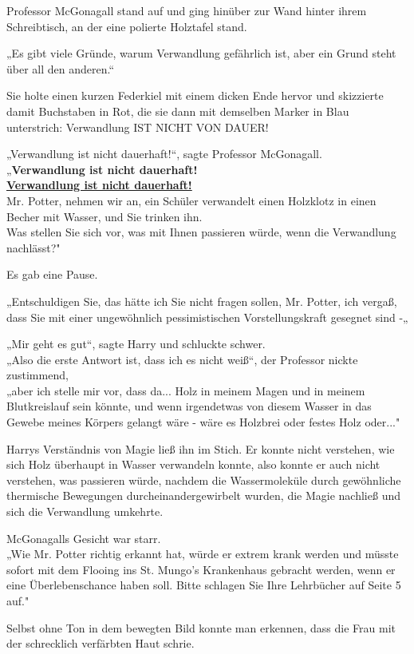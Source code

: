 {Professor McGonagall stand auf und ging hinüber zur Wand hinter ihrem Schreibtisch, an der eine polierte Holztafel stand.

„Es gibt viele Gründe, warum Verwandlung gefährlich ist, aber ein Grund steht über all den anderen.“

Sie holte einen kurzen Federkiel mit einem dicken Ende hervor und skizzierte damit Buchstaben in Rot, die sie dann mit demselben Marker in Blau unterstrich: Verwandlung IST NICHT VON DAUER!

„Verwandlung ist nicht dauerhaft!“, sagte Professor McGonagall.\\ „\textbf{Verwandlung ist nicht dauerhaft!}\\ \textbf{\uline{Verwandlung ist nicht dauerhaft!}}\\ Mr. Potter, nehmen wir an, ein Schüler verwandelt einen Holzklotz in einen Becher mit Wasser, und Sie trinken ihn.\\ Was stellen Sie sich vor, was mit Ihnen passieren würde, wenn die Verwandlung nachlässt?"

Es gab eine Pause.

„Entschuldigen Sie, das hätte ich Sie nicht fragen sollen, Mr. Potter, ich vergaß, dass Sie mit einer ungewöhnlich pessimistischen Vorstellungskraft gesegnet sind -„

„Mir geht es gut“, sagte Harry und schluckte schwer.\\ „Also die erste Antwort ist, dass ich es nicht weiß“, der Professor nickte zustimmend,\\ „aber ich stelle mir vor, dass da... Holz in meinem Magen und in meinem Blutkreislauf sein könnte, und wenn irgendetwas von diesem Wasser in das Gewebe meines Körpers gelangt wäre - wäre es Holzbrei oder festes Holz oder..."

Harrys Verständnis von Magie ließ ihn im Stich. Er konnte nicht verstehen, wie sich Holz überhaupt in Wasser verwandeln konnte, also konnte er auch nicht verstehen, was passieren würde, nachdem die Wassermoleküle durch gewöhnliche thermische Bewegungen durcheinandergewirbelt wurden, die Magie nachließ und sich die Verwandlung umkehrte.

McGonagalls Gesicht war starr.\\ „Wie Mr. Potter richtig erkannt hat, würde er extrem krank werden und müsste sofort mit dem Flooing ins St. Mungo's Krankenhaus gebracht werden, wenn er eine Überlebenschance haben soll. Bitte schlagen Sie Ihre Lehrbücher auf Seite 5 auf."

Selbst ohne Ton in dem bewegten Bild konnte man erkennen, dass die Frau mit der schrecklich verfärbten Haut schrie.

}
